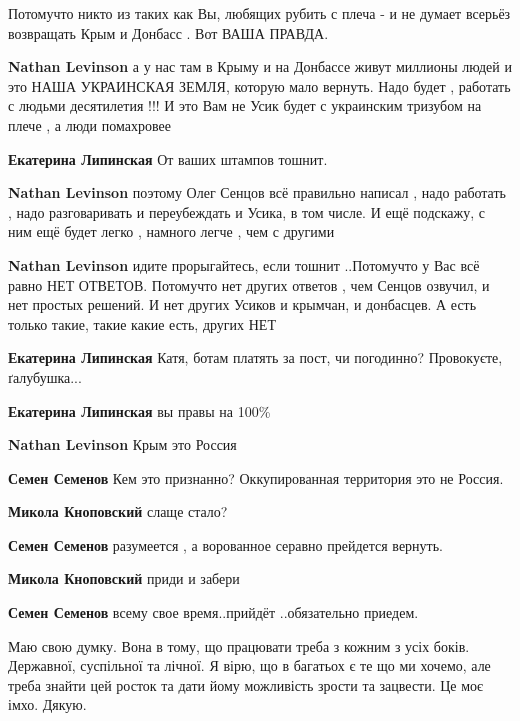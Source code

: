 \begin{itemize}
\begin{itemize}
Потомучто никто из таких как Вы, любящих рубить с плеча - и не думает всерьёз возвращать Крым и Донбасс . Вот ВАША ПРАВДА.

\textbf{Nathan Levinson} а у нас там в Крыму и на Донбассе живут миллионы людей и это НАША УКРАИНСКАЯ ЗЕМЛЯ, которую мало вернуть. Надо будет , работать с людьми десятилетия !!! И это Вам не Усик будет с украинским тризубом на плече , а люди помахровее

\textbf{Екатерина Липинская} От ваших штампов тошнит.

\textbf{Nathan Levinson} поэтому Олег Сенцов всё правильно написал , надо работать , надо разговаривать и переубеждать и Усика, в том числе. И ещё подскажу, с ним ещё будет легко , намного легче , чем с другими

\textbf{Nathan Levinson} идите прорыгайтесь, если тошнит ..Потомучто у Вас всё равно НЕТ ОТВЕТОВ. Потомучто нет других ответов , чем Сенцов озвучил, и нет простых решений. И нет других Усиков и крымчан, и донбасцев. А есть только такие, такие какие есть, других НЕТ

\textbf{Екатерина Липинская} Катя, ботам платять за пост, чи погодинно? Провокуєте, ґалубушка...

\textbf{Екатерина Липинская} вы правы на 100\%

\textbf{Nathan Levinson} Крым это Россия

\textbf{Семен Семенов} Кем это признанно? Оккупированная территория это не Россия.

\textbf{Микола Кноповский} слаще стало?

\textbf{Семен Семенов} разумеется , а ворованное серавно прейдется вернуть.

\textbf{Микола Кноповский} приди и забери

\textbf{Семен Семенов} всему свое время..прийдёт ..обязательно приедем.
\end{itemize} %


Маю свою думку. Вона в тому, що працювати треба з кожним з усіх боків.
Державної, суспільної та лічної. Я вірю, що в багатьох є те що ми хочемо, але
треба знайти цей росток та дати йому можливість зрости та зацвести. Це моє
імхо. Дякую.


\end{itemize}
